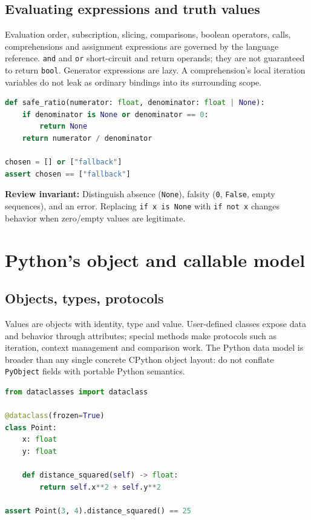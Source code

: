\documentclass[
  11pt,
]{report}
\newcommand{\passthrough}[1]{#1}
\begin{document}
\section{Evaluating expressions and truth
values}\label{evaluating-expressions-and-truth-values}

Evaluation order, subscription, slicing, comparisons, boolean operators,
calls, comprehensions and assignment expressions are governed by the
language reference. \passthrough{\lstinline!and!} and
\passthrough{\lstinline!or!} short-circuit and return operands; they are
not guaranteed to return \passthrough{\lstinline!bool!}. Generator
expressions are lazy. A comprehension's local iteration variables do not
leak as ordinary bindings into its surrounding scope.

\begin{lstlisting}[language=Python]
def safe_ratio(numerator: float, denominator: float | None):
    if denominator is None or denominator == 0:
        return None
    return numerator / denominator

chosen = [] or ["fallback"]
assert chosen == ["fallback"]
\end{lstlisting}

\textbf{Review invariant:} Distinguish absence
(\passthrough{\lstinline!None!}), falsity (\passthrough{\lstinline!0!},
\passthrough{\lstinline!False!}, empty sequences), and an error.
Replacing \passthrough{\lstinline!if x is None!} with
\passthrough{\lstinline!if not x!} changes behavior when zero/empty
values are legitimate.

\chapter{Python's object and callable
model}\label{pythons-object-and-callable-model}

\section{Objects, types, protocols}\label{objects-types-protocols}

Values are objects with identity, type and value. User-defined classes
expose data and behavior through attributes; special methods make
protocols such as iteration, context management and comparison work. The
Python data model is broader than any single concrete CPython object
layout: do not conflate \passthrough{\lstinline!PyObject!} fields with
portable Python semantics.

\begin{lstlisting}[language=Python]
from dataclasses import dataclass

@dataclass(frozen=True)
class Point:
    x: float
    y: float

    def distance_squared(self) -> float:
        return self.x**2 + self.y**2

assert Point(3, 4).distance_squared() == 25
\end{lstlisting}
\end{document}
